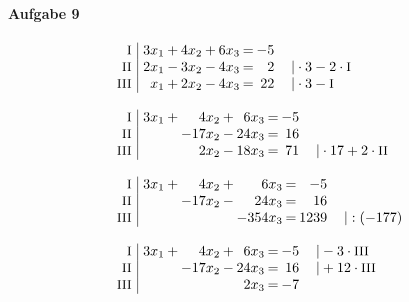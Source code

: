 \paragraph{Aufgabe 9}
\begin{equation*}
\begin{array}{l}
\setlength{\arraycolsep}{1pt}
\begin{array}{r|rcrcrcrl}
    \text{\small I } &\; 3x_{1} & + & 4x_{2} & + & 6x_{3} & = & -5 &                                    \\
   \text{\small II } &\; 2x_{1} & - & 3x_{2} & - & 4x_{3} & = &  2 & \quad|\cdot3-2\cdot\text{\small I} \\
  \text{\small III } &\;  x_{1} & + & 2x_{2} & - & 4x_{3} & = & 22 & \quad|\cdot3-\text{\small I}         
\end{array}
\\ \\
\setlength{\arraycolsep}{1pt}
\begin{array}{r|rcrcrcrl}
    \text{\small I } &\; 3x_{1} & + &   4x_{2} & + &  6x_{3} & = & -5 &                                      \\
   \text{\small II } &\;        &   & -17x_{2} & - & 24x_{3} & = & 16 &                                      \\
  \text{\small III } &\;        &   &   2x_{2} & - & 18x_{3} & = & 71 & \quad|\cdot17+2\cdot\text{\small II}   
\end{array}
\\ \\
\setlength{\arraycolsep}{1pt}
\begin{array}{r|rcrcrcrl}
    \text{\small I } &\; 3x_{1} & + &   4x_{2} & + &    6x_{3} & = &   -5 &               \\
   \text{\small II } &\;        &   & -17x_{2} & - &   24x_{3} & = &   16 &               \\
  \text{\small III } &\;        &   &          &   & -354x_{3} & = & 1239 & \quad|:(-177)   
\end{array}
\\ \\
\setlength{\arraycolsep}{1pt}
\begin{array}{r|rcrcrcrl}
    \text{\small I } &\; 3x_{1} & + &   4x_{2} & + &  6x_{3} & = & -5 & \quad|-3\cdot\text{\small III}  \\
   \text{\small II } &\;        &   & -17x_{2} & - & 24x_{3} & = & 16 & \quad|+12\cdot\text{\small III} \\
  \text{\small III } &\;        &   &          &   &  2x_{3} & = & -7 &                                   

\end{array}
\end{array}
\end{equation*}
